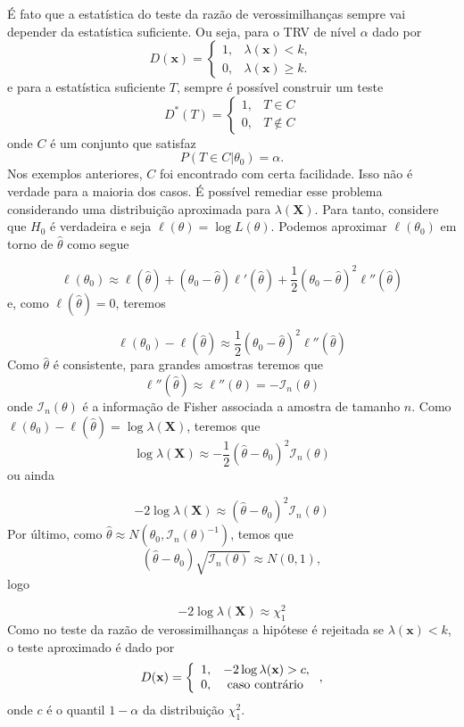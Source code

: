 \documentclass[
  letterpaper,
  DIV=11,
  numbers=noendperiod]{scrartcl}
\begin{document}
É fato que a estatística do teste da razão de verossimilhanças sempre
vai depender da estatística suficiente. Ou seja, para o TRV de nível
\(\alpha\) dado por
\[D(\textbf{x})=\left\{\begin{array}{ll}1,&\lambda(\textbf{x})<k,\\ 0,&\lambda(\textbf{x})\geq k.\end{array}\right.\]
e para a estatística suficiente \(T\), sempre é possível construir um
teste
\[D^*(T)=\left\{\begin{array}{ll}1,&T\in C\\0,&T\notin C \end{array}\right.\]
onde \(C\) é um conjunto que satisfaz \[P(T\in C|\theta_0)=\alpha.\] Nos
exemplos anteriores, \(C\) foi encontrado com certa facilidade. Isso não
é verdade para a maioria dos casos. É possível remediar esse problema
considerando uma distribuição aproximada para \(\lambda(\textbf{X})\).
Para tanto, considere que \(H_0\) é verdadeira e seja
\(\ell(\theta)=\log L(\theta)\). Podemos aproximar \(\ell(\theta_0)\) em
torno de \(\hat{\theta}\) como segue

\[\ell(\theta_0)\approx \ell(\hat{\theta})+(\theta_0-\hat{\theta})\ell'(\hat{\theta})+\frac{1}{2}(\theta_0-\hat{\theta})^2\ell''(\hat{\theta})\]
e, como \(\ell(\hat{\theta})=0\), teremos

\[\ell(\theta_0)-\ell(\hat{\theta})\approx \frac{1}{2}(\theta_0-\hat{\theta})^2\ell''(\hat{\theta})\]
Como \(\hat{\theta}\) é consistente, para grandes amostras teremos que
\[\ell''(\hat{\theta})\approx \ell''(\theta)=-\mathcal{I}_n(\theta)\]
onde \(\mathcal{I}_n(\theta)\) é a informação de Fisher associada a
amostra de tamanho \(n\). Como
\(\ell(\theta_0)-\ell(\hat{\theta})=\log \lambda(\textbf{X})\), teremos
que
\[\log \lambda(\textbf{X})\approx -\frac{1}{2}(\hat{\theta}-\theta_0)^2\mathcal{I}_n(\theta)\]
ou ainda

\[-2\log \lambda(\textbf{X})\approx (\hat{\theta}-\theta_0)^2\mathcal{I}_n(\theta)\]
Por último, como
\(\hat{\theta}\approx N(\theta_0,\mathcal{I}_n(\theta)^{-1})\), temos
que
\[(\hat{\theta}-\theta_0)\sqrt{\mathcal{I}_n(\theta)}\approx N(0,1),\]
logo

\[-2\log \lambda(\textbf{X})\approx \chi^2_1\] Como no teste da razão de
verossimilhanças a hipótese é rejeitada se \(\lambda(\textbf{x})<k\), o
teste aproximado é dado por
\[D(\textbf{x})=\left\{\begin{array}{ll}1,&-2\log \lambda(\textbf{x})>c,\\0,&\hbox{ caso contrário}\end{array}\right.,\]
onde \(c\) é o quantil \(1-\alpha\) da distribuição \(\chi^2_1\).
\end{document}
